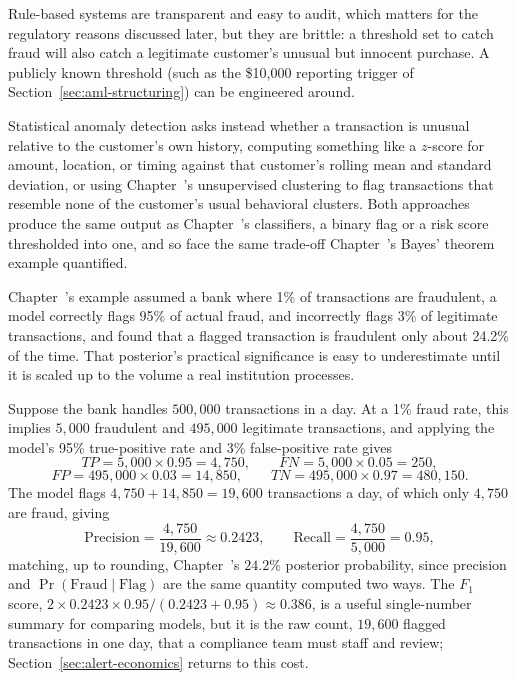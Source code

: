 \documentclass[../ai_in_finance]{subfiles}
\begin{document}
Rule-based systems are transparent and easy to audit, which matters for the regulatory reasons discussed later, but they are brittle: a threshold set to catch fraud will also catch a legitimate customer's unusual but innocent purchase. A publicly known threshold (such as the \$10,000 reporting trigger of Section~\ref{sec:aml-structuring}) can be engineered around.

Statistical anomaly detection asks instead whether a transaction is unusual relative to the customer's own history, computing something like a $z$-score for amount, location, or timing against that customer's rolling mean and standard deviation, or using Chapter~'s unsupervised clustering to flag transactions that resemble none of the customer's usual behavioral clusters. Both approaches produce the same output as Chapter~'s classifiers, a binary flag or a risk score thresholded into one, and so face the same trade-off Chapter~'s Bayes' theorem example quantified.


Chapter~'s example assumed a bank where 1\% of transactions are fraudulent, a model correctly flags 95\% of actual fraud, and incorrectly flags 3\% of legitimate transactions, and found that a flagged transaction is fraudulent only about 24.2\% of the time. That posterior's practical significance is easy to underestimate until it is scaled up to the volume a real institution processes.

Suppose the bank handles $500{,}000$ transactions in a day. At a 1\% fraud rate, this implies $5{,}000$ fraudulent and $495{,}000$ legitimate transactions, and applying the model's 95\% true-positive rate and 3\% false-positive rate gives
\begin{equation*}
TP = 5{,}000 \times 0.95 = 4{,}750, \qquad FN = 5{,}000 \times 0.05 = 250,
\end{equation*}
\begin{equation*}
FP = 495{,}000 \times 0.03 = 14{,}850, \qquad TN = 495{,}000 \times 0.97 = 480{,}150.
\end{equation*}
The model flags $4{,}750 + 14{,}850 = 19{,}600$ transactions a day, of which only $4{,}750$ are fraud, giving
\begin{equation*}
\text{Precision} = \frac{4{,}750}{19{,}600} \approx 0.2423, \qquad \text{Recall} = \frac{4{,}750}{5{,}000} = 0.95,
\end{equation*}
matching, up to rounding, Chapter~'s $24.2\%$ posterior probability, since precision and $\Pr(\text{Fraud}\mid\text{Flag})$ are the same
quantity computed two ways. The $F_1$ score, $2\times0.2423\times0.95/(0.2423+0.95)\approx0.386$, is a useful single-number summary for
comparing models, but it is the raw count, $19{,}600$ flagged transactions in one day, that a compliance team must staff and review;
Section~\ref{sec:alert-economics} returns to this cost.
\end{document}
